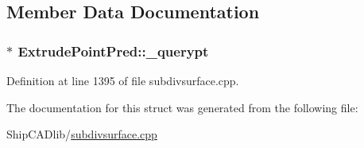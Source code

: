 \subsection{Member Data Documentation}
\hypertarget{structExtrudePointPred_a418b8e48a02f969ff11edb43c0ed010c}{
\subsubsection[{\-\_\-querypt}]{$\ast$ Extrude\-Point\-Pred\-::\-\_\-querypt}}\label{structExtrudePointPred_a418b8e48a02f969ff11edb43c0ed010c}


Definition at line 1395 of file subdivsurface.\-cpp.



The documentation for this struct was generated from the following file\-:\begin{DoxyCompactItemize}
\item 
Ship\-C\-A\-Dlib/\hyperlink{subdivsurface_8cpp}{subdivsurface.\-cpp}\end{DoxyCompactItemize}
